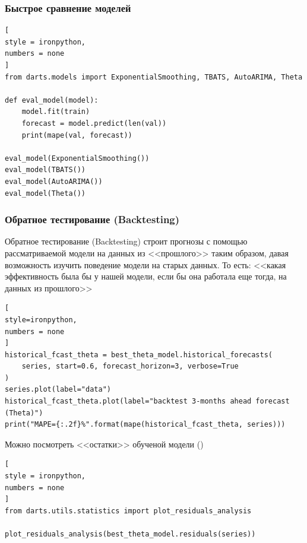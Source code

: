 \documentclass[%
	11pt,
	a4paper,
	utf8,
		]{article}
\begin{document}
\subsubsection{Быстрое сравнение моделей}

\begin{lstlisting}[
style = ironpython,
numbers = none
]
from darts.models import ExponentialSmoothing, TBATS, AutoARIMA, Theta

def eval_model(model):
    model.fit(train)
    forecast = model.predict(len(val))
    print(mape(val, forecast))
    
eval_model(ExponentialSmoothing())
eval_model(TBATS())
eval_model(AutoARIMA())
eval_model(Theta())
\end{lstlisting}

\subsubsection{Обратное тестирование (Backtesting)}

Обратное тестирование (Backtesting) строит прогнозы с помощью рассматриваемой модели на данных из <<прошлого>> таким образом, давая возможность изучить поведение модели на старых данных. То есть: <<какая эффективность была бы у нашей модели, если бы она работала еще тогда, на данных из прошлого>>
\begin{lstlisting}[
style=ironpython,
numbers = none
]
historical_fcast_theta = best_theta_model.historical_forecasts(
    series, start=0.6, forecast_horizon=3, verbose=True
)
series.plot(label="data")
historical_fcast_theta.plot(label="backtest 3-months ahead forecast (Theta)")
print("MAPE={:.2f}%".format(mape(historical_fcast_theta, series)))
\end{lstlisting}

Можно посмотреть <<остатки>> обученой модели ()
\begin{lstlisting}[
style = ironpython,
numbers = none
]
from darts.utils.statistics import plot_residuals_analysis

plot_residuals_analysis(best_theta_model.residuals(series))
\end{lstlisting}
\end{document}
